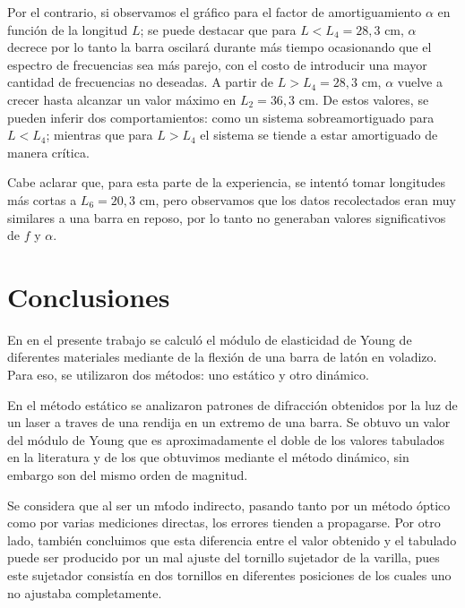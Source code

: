 \documentclass[twoside,twocolumn,a4paper]{article}
\begin{document}
Por el contrario, si observamos el gr\'afico para el factor de amortiguamiento $\alpha$ en funci\'on de la longitud $L$; se puede destacar que para $L < L_{4} = 28,3$ cm, $\alpha$ decrece por lo tanto la barra oscilar\'a durante m\'as tiempo ocasionando que el espectro de frecuencias sea m\'as parejo, con el costo de introducir una mayor cantidad de frecuencias no deseadas.
A partir de $L > L_{4} = 28,3$ cm, $\alpha$ vuelve a crecer hasta alcanzar un valor m\'aximo en $L_{2} = 36,3$ cm. De estos valores, se pueden inferir dos comportamientos: como un sistema sobreamortiguado para $L < L_{4}$; mientras que para $L > L_{4}$ el sistema se tiende a estar amortiguado de manera cr\'itica. 

Cabe aclarar que, para esta parte de la experiencia, se intent\'o tomar longitudes m\'as cortas a $L_{6} = 20,3$ cm, pero observamos que los datos recolectados eran muy similares a una barra en reposo, por lo tanto no generaban valores significativos de $f$ y $\alpha$.


\section{Conclusiones}

En en el presente trabajo se calcul\'o el m\'odulo de elasticidad de Young de diferentes materiales mediante de la flexi\'on de una barra de lat\'on en voladizo. Para eso, se utilizaron dos m\'etodos: uno est\'atico y otro din\'amico. \newline

En el m\'etodo est\'atico se analizaron patrones de difracci\'on obtenidos por la luz de un laser a traves de una rendija en un extremo de una barra. Se obtuvo un valor del m\'odulo de Young que es aproximadamente el doble de los valores tabulados en la literatura y de los que obtuvimos mediante el m\'etodo din\'amico, sin embargo son del mismo orden de magnitud. \newline

Se considera que al ser un m\'todo indirecto, pasando tanto por un m\'etodo \'optico como por varias mediciones directas, los errores tienden a propagarse. Por otro lado, tambi\'en concluimos que esta diferencia entre el valor obtenido y el tabulado puede ser producido por un mal ajuste del tornillo sujetador de la varilla, pues este sujetador consist\'ia en dos tornillos en diferentes posiciones de los cuales uno no ajustaba completamente. \newline
\end{document}
